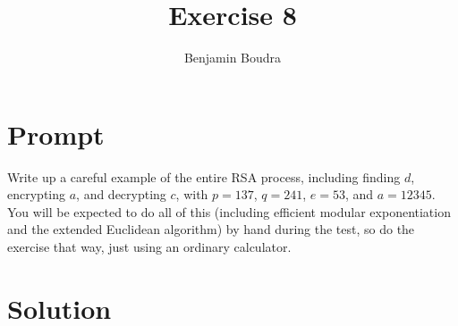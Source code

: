 \documentclass[10pt,a4paper]{article}
\author{Benjamin Boudra}
\title{Exercise 8}
\begin{document}
\maketitle
\tableofcontents

\section{Prompt}
Write up a careful example of the entire RSA process, including finding $d$, encrypting $a$, and decrypting $c$, with $p = 137$, $q = 241$, $e = 53$, and $a = 12345$. You will be expected to do all of this (including efficient modular exponentiation and the extended Euclidean algorithm) by hand during the test, so do the exercise that way, just using an ordinary calculator.
\section{Solution}
\end{document}
